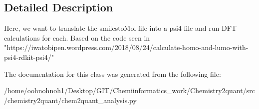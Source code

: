 \subsection{Detailed Description}
\begin{DoxyVerb}Here, we want to translate the smilestoMol file into a psi4 file and run DFT calculations for each.
Based on the code seen in "https://iwatobipen.wordpress.com/2018/08/24/calculate-homo-and-lumo-with-psi4-rdkit-psi4/"
\end{DoxyVerb}


The documentation for this class was generated from the following file\+:\begin{DoxyCompactItemize}
\item
/home/oohnohnoh1/\+Desktop/\+G\+I\+T/\+Chemiinformatics\+\_\+work/\+Chemistry2quant/src/chemistry2quant/chem2quant\+\_\+analysis.\+py\end{DoxyCompactItemize}
